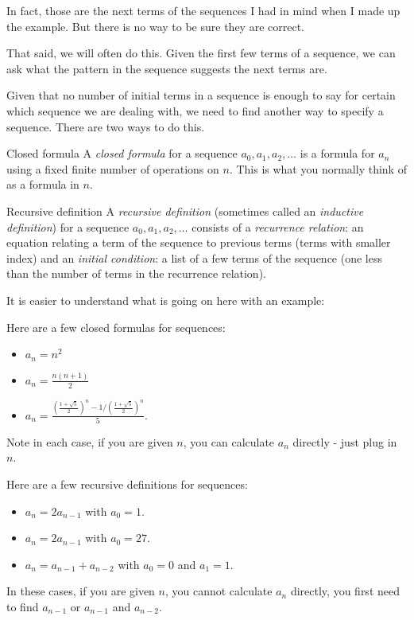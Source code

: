 \documentclass[12pt]{article}
\begin{document}
\begin{example}
\begin{solution}
\begin{enumerate}
	 \end{enumerate}
	 In fact, those are the next terms of the sequences I had in mind when I made up the example.  But there is no way to be sure they are correct.  
	 
	 That said, we will often do this.  Given the first few terms of a sequence, we can ask what the pattern in the sequence suggests the next terms are.  
	\end{solution}

\end{example}

Given that no number of initial terms in a sequence is enough to say for certain which sequence we are dealing with, we need to find another way to specify a sequence.  There are two ways to do this.

\begin{defbox}{Closed formula}
 A {\em closed formula} for a sequence $a_0, a_1, a_2,\ldots$ is a formula for $a_n$ using a fixed finite number of operations on $n$.  This is what you normally think of as a formula in $n$.  
\end{defbox}

\begin{defbox}{Recursive definition}
 A {\em recursive definition} (sometimes called an {\em inductive definition}) for a sequence $a_0, a_1, a_2, \ldots$ consists of a {\em recurrence relation}: an equation relating a term of the sequence to previous terms (terms with smaller index) and an {\em initial condition}: a list of a few terms of the sequence (one less than the number of terms in the recurrence relation).
\end{defbox}

It is easier to understand what is going on here with an example:

\begin{example}
 Here are a few closed formulas for sequences:
 \begin{itemize}
  \item $a_n = n^2$
  \item $a_n = \frac{n(n+1)}{2}$
  \item $a_n = \frac{(\frac{1 + \sqrt 5}{2})^n - 1/(\frac{1 + \sqrt 5}{2})^n}{5}$.
 \end{itemize}
 Note in each case, if you are given $n$, you can calculate $a_n$ directly - just plug in $n$.
 
 Here are a few recursive definitions for sequences:
 \begin{itemize}
  \item $a_n = 2a_{n-1}$ with $a_0 = 1$.
  \item $a_n = 2a_{n-1}$ with $a_0 = 27$.
  \item $a_n = a_{n-1} + a_{n-2}$ with $a_0 = 0$ and $a_1 = 1$.
 \end{itemize}
  In these cases, if you are given $n$, you cannot calculate $a_n$ directly, you first need to find $a_{n-1}$ or $a_{n-1}$ and $a_{n-2}$.  
\end{example}
\end{document}
